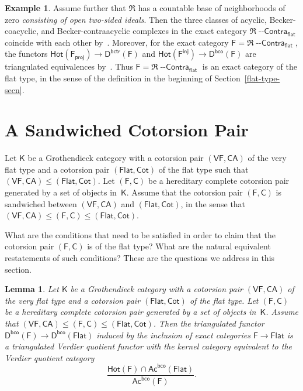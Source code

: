 \documentclass[12pt,a4paper]{amsart}
\newcommand{\+}{\nobreakdash-}
\renewcommand{\:}{\colon}
\newcommand{\rarrow}{\longrightarrow}
\newcommand{\Contra}{{\operatorname{\mathsf{--Contra}}}}
\newcommand{\sC}{\mathsf C}
\newcommand{\sD}{\mathsf D}
\newcommand{\sF}{\mathsf F}
\newcommand{\sK}{\mathsf K}
\newcommand{\fR}{\mathfrak R}
\newcommand{\VF}{\mathsf{VF}}
\newcommand{\CA}{\mathsf{CA}}
\newcommand{\Flat}{\mathsf{Flat}}
\newcommand{\Cot}{\mathsf{Cot}}
\newcommand{\Hot}{\mathsf{Hot}}
\newcommand{\Ac}{\mathsf{Ac}}
\newcommand{\proj}{\mathsf{proj}}
\newcommand{\inj}{\mathsf{inj}}
\renewcommand{\flat}{\mathsf{flat}}
\newcommand{\bco}{\mathsf{bco}}
\newcommand{\bctr}{\mathsf{bctr}}
\newcommand{\Section}[1]{\bigskip\section{#1}\medskip}
\theoremstyle{plain}
\newtheorem{lem}[thm]{Lemma}
\theoremstyle{definition}
\newtheorem{ex}[thm]{Example}
\begin{document}
\begin{ex}
 Assume further that $\fR$ has a countable base of neighborhoods of
zero \emph{consisting of open two-sided ideals}.
 Then the three classes of acyclic, Becker-coacyclic, and
Becker-contraacyclic complexes in the exact category $\fR\Contra_\flat$
coincide with each other
by~\cite[Theorem~11.1\,(i$^{\mathrm{c}}$)\,$\Leftrightarrow$\,%
(ii$^{\mathrm{c}}$)\,$\Leftrightarrow$\,(vi$^{\mathrm{c}}$)]{Pbc}.
 Moreover, for the exact category $\sF=\fR\Contra_\flat$, the functors
$\Hot(\sF_\proj)\rarrow\sD^\bctr(\sF)$ and
$\Hot(\sF^\inj)\rarrow\sD^\bco(\sF)$ are triangulated
equivalences by~\cite[Corollary~11.2]{Pbc}.
 Thus $\sF=\fR\Contra_\flat$ is an exact category of the flat type, in
the sense of the definition in the beginning of
Section~\ref{flat-type-secn}.
\end{ex}


\Section{A Sandwiched Cotorsion Pair}  \label{sandwiched-secn}

 Let $\sK$ be a Grothendieck category with a cotorsion pair
$(\VF,\CA)$ of the very flat type and a cotorsion pair $(\Flat,\Cot)$
of the flat type such that $(\VF,\CA)\le(\Flat,\Cot)$.
 Let $(\sF,\sC)$ be a hereditary complete cotorsion pair generated by
a set of objects in~$\sK$.
 Assume that the cotorsion pair $(\sF,\sC)$ is sandwiched between
$(\VF,\CA)$ and $(\Flat,\Cot)$, in the sense that
$(\VF,\CA)\le(\sF,\sC)\le(\Flat,\Cot)$.

 What are the conditions that need to be satisfied in order to claim
that the cotorsion pair $(\sF,\sC)$ is of the flat type?
 What are the natural equivalent restatements of such conditions?
 These are the questions we address in this section. 

\begin{lem} \label{coderived-F-to-Flat-Verdier-quotient}
 Let\/ $\sK$ be a Grothendieck category with a cotorsion pair
$(\VF,\CA)$ of the very flat type and a cotorsion pair $(\Flat,\Cot)$
of the flat type.
 Let $(\sF,\sC)$ be a hereditary complete cotorsion pair generated by
a set of objects in\/~$\sK$.
 Assume that $(\VF,\CA)\le(\sF,\sC)\le(\Flat,\Cot)$.
 Then the triangulated functor\/ $\sD^\bco(\sF)\rarrow\sD^\bco(\Flat)$
induced by the inclusion of exact categories\/ $\sF\rarrow\Flat$ is
a triangulated Verdier quotient functor with the kernel category
equivalent to the Verdier quotient category
$$
 \frac{\Hot(\sF)\cap\Ac^\bco(\Flat)}{\Ac^\bco(\sF)}.
$$
\end{lem}
\end{document}
